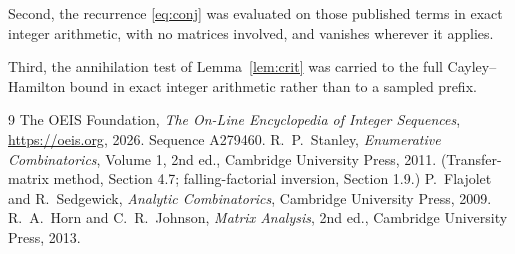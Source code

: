 \documentclass[11pt,a4paper]{article}
\theoremstyle{plain}
\theoremstyle{definition}
\begin{document}
Second, the recurrence \eqref{eq:conj} was evaluated on those published terms in exact
integer arithmetic, with no matrices involved, and vanishes wherever it applies.

Third, the annihilation test of Lemma~\ref{lem:crit} was carried to the full
Cayley--Hamilton bound in exact integer arithmetic rather than to a sampled prefix.

\begin{thebibliography}{9}
 The OEIS Foundation, \emph{The On-Line Encyclopedia of Integer
Sequences}, \url{https://oeis.org}, 2026. Sequence A279460.
 R.~P.~Stanley, \emph{Enumerative Combinatorics}, Volume 1, 2nd ed.,
Cambridge University Press, 2011. (Transfer-matrix method, Section 4.7; falling-factorial
inversion, Section 1.9.)
 P.~Flajolet and R.~Sedgewick, \emph{Analytic Combinatorics}, Cambridge
University Press, 2009.
 R.~A.~Horn and C.~R.~Johnson, \emph{Matrix Analysis}, 2nd ed., Cambridge
University Press, 2013.
\end{thebibliography}
\end{document}
